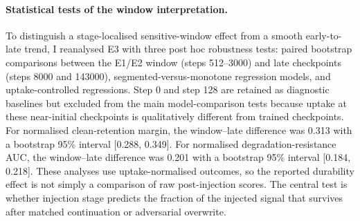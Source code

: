 \paragraph{Statistical tests of the window interpretation.}
To distinguish a stage-localised sensitive-window effect from a smooth early-to-late trend, I reanalysed E3 with three post hoc robustness tests: paired bootstrap comparisons between the E1/E2 window (steps 512--3000) and late checkpoints (steps 8000 and 143000), segmented-versus-monotone regression models, and uptake-controlled regressions. Step 0 and step 128 are retained as diagnostic baselines but excluded from the main model-comparison tests because uptake at these near-initial checkpoints is qualitatively different from trained checkpoints.
For normalised clean-retention margin, the window--late difference was 0.313 with a bootstrap 95\% interval [0.288, 0.349].
For normalised degradation-resistance AUC, the window--late difference was 0.201 with a bootstrap 95\% interval [0.184, 0.218].
These analyses use uptake-normalised outcomes, so the reported durability effect is not simply a comparison of raw post-injection scores. The central test is whether injection stage predicts the fraction of the injected signal that survives after matched continuation or adversarial overwrite.